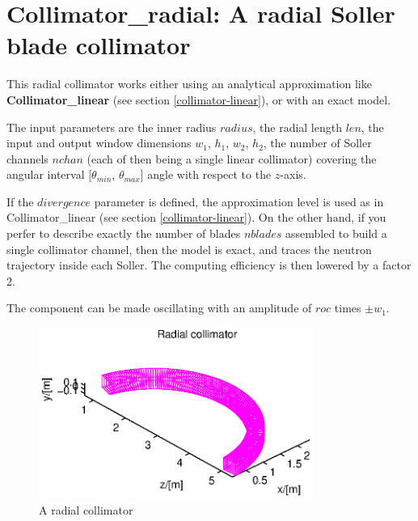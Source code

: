 \section{Collimator\_radial: A radial Soller blade collimator}


This radial collimator works either using an analytical approximation
like {\bf Collimator\_linear} (see section \ref{collimator-linear}), 
or with an exact model.

The input parameters are the inner radius $radius$, the radial length $len$, 
the input and output window dimensions $w_1$, $h_1$, $w_2$, $h_2$, 
the number of Soller channels $nchan$ 
(each of then being a single linear collimator) covering the angular interval
[$\theta_{min}$, $\theta_{max}$] angle with respect to the $z$-axis.

If the $divergence$ parameter is defined, 
the approximation level is used as in {\rm Collimator\_linear} 
(see section \ref{collimator-linear}). 
On the other hand, if you perfer to describe exactly the number of blades 
$nblades$ assembled to build a single collimator channel, 
then the model is exact, and traces the neutron trajectory inside each Soller. 
The computing efficiency is then lowered by a factor 2.

The component can be made oscillating with an amplitude of $roc$ times 
$\pm w_1$.

\begin{figure}
  \begin{center}
    \includegraphics[width=0.8\textwidth]{figures/radial.eps}
  \end{center}
\caption{A radial collimator}
\label{f:coll-radial}
\end{figure}
